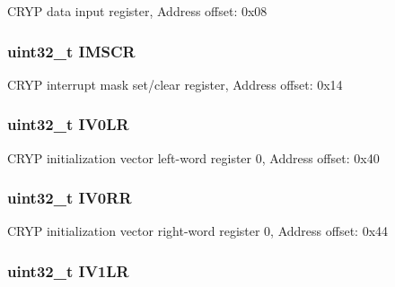 C\-R\-Y\-P data input register, Address offset\-: 0x08 \hypertarget{struct_c_r_y_p___type_def_adcdd7c23a99f81c21dae2e9f989632e1}{
\subsubsection[{I\-M\-S\-C\-R}]{ uint32\-\_\-t I\-M\-S\-C\-R}}\label{struct_c_r_y_p___type_def_adcdd7c23a99f81c21dae2e9f989632e1}
C\-R\-Y\-P interrupt mask set/clear register, Address offset\-: 0x14 \hypertarget{struct_c_r_y_p___type_def_ab1efba4cdf22c525fce804375961d567}{
\subsubsection[{I\-V0\-L\-R}]{ uint32\-\_\-t I\-V0\-L\-R}}\label{struct_c_r_y_p___type_def_ab1efba4cdf22c525fce804375961d567}
C\-R\-Y\-P initialization vector left-\/word register 0, Address offset\-: 0x40 \hypertarget{struct_c_r_y_p___type_def_aeb1990f7c28e815a4962db3a861937bb}{
\subsubsection[{I\-V0\-R\-R}]{ uint32\-\_\-t I\-V0\-R\-R}}\label{struct_c_r_y_p___type_def_aeb1990f7c28e815a4962db3a861937bb}
C\-R\-Y\-P initialization vector right-\/word register 0, Address offset\-: 0x44 \hypertarget{struct_c_r_y_p___type_def_aad2f43335b25a0065f3d327364610cbd}{
\subsubsection[{I\-V1\-L\-R}]{ uint32\-\_\-t I\-V1\-L\-R}}\label{struct_c_r_y_p___type_def_aad2f43335b25a0065f3d327364610cbd}

